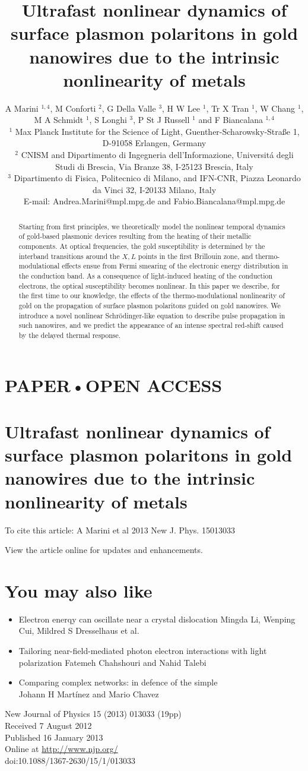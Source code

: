 \documentclass[10pt]{article}
\title{Ultrafast nonlinear dynamics of surface plasmon polaritons in gold nanowires due to the intrinsic nonlinearity of metals }
\author{A Marini ${ }^{1,4}$, M Conforti ${ }^{2}$, G Della Valle ${ }^{3}$, H W Lee ${ }^{1}$, Tr X Tran ${ }^{1}$, W Chang ${ }^{1}$, M A Schmidt ${ }^{1}$, S Longhi ${ }^{3}$, P St J Russell ${ }^{1}$ and F Biancalana ${ }^{1,4}$\\
${ }^{1}$ Max Planck Institute for the Science of Light, Guenther-Scharowsky-Straße 1, D-91058 Erlangen, Germany\\
${ }^{2}$ CNISM and Dipartimento di Ingegneria dell’Informazione, Universitá degli Studi di Brescia, Via Branze 38, I-25123 Brescia, Italy\\
${ }^{3}$ Dipartimento di Fisica, Politecnico di Milano, and IFN-CNR, Piazza Leonardo da Vinci 32, I-20133 Milano, Italy\\
E-mail: Andrea.Marini@mpl.mpg.de and Fabio.Biancalana@mpl.mpg.de}
\date{}
\begin{document}
\maketitle
\captionsetup{singlelinecheck=false}
\section*{PAPER•OPEN ACCESS}
\section*{Ultrafast nonlinear dynamics of surface plasmon polaritons in gold nanowires due to the intrinsic nonlinearity of metals}
To cite this article: A Marini et al 2013 New J. Phys. 15013033

View the article online for updates and enhancements.

\section*{You may also like}
\begin{itemize}
  \item Electron enerqy can oscillate near a crystal dislocation Mingda Li, Wenping Cui, Mildred S Dresselhaus et al.
  \item Tailoring near-field-mediated photon electron interactions with light polarization Fatemeh Chahshouri and Nahid Talebi
  \item Comparing complex networks: in defence of the simple\\
Johann H Martínez and Mario Chavez
\end{itemize}

New Journal of Physics 15 (2013) 013033 (19pp)\\
Received 7 August 2012\\
Published 16 January 2013\\
Online at \href{http://www.njp.org/}{http://www.njp.org/}\\
doi:10.1088/1367-2630/15/1/013033

\begin{abstract}
Starting from first principles, we theoretically model the nonlinear temporal dynamics of gold-based plasmonic devices resulting from the heating of their metallic components. At optical frequencies, the gold susceptibility is determined by the interband transitions around the $X, L$ points in the first Brillouin zone, and thermo-modulational effects ensue from Fermi smearing of the electronic energy distribution in the conduction band. As a consequence of light-induced heating of the conduction electrons, the optical susceptibility becomes nonlinear. In this paper we describe, for the first time to our knowledge, the effects of the thermo-modulational nonlinearity of gold on the propagation of surface plasmon polaritons guided on gold nanowires. We introduce a novel nonlinear Schrödinger-like equation to describe pulse propagation in such nanowires, and we predict the appearance of an intense spectral red-shift caused by the delayed thermal response.
\end{abstract}
\end{document}
